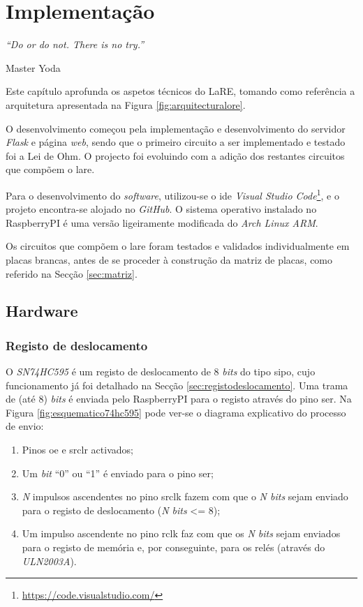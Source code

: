 \label{Capítulo4}
\chapter{Implementação}
\begin{center}
	\textit{``Do or do not. There is no try.''}

	Master Yoda
\end{center}
Este capítulo aprofunda os aspetos técnicos do LaRE, tomando como referência a arquitetura apresentada na Figura \ref{fig:arquitecturalore}.

O desenvolvimento começou pela implementação e desenvolvimento do servidor \textit{Flask} e página \textit{web}, sendo que o primeiro circuito a ser implementado e testado foi a Lei de Ohm. O projecto foi evoluindo com a adição dos restantes circuitos que compõem o \acrshort{lare}.

Para o desenvolvimento do \textit{software}, utilizou-se o \acrshort{ide} \textit{Visual Studio Code}\footnote{\url{https://code.visualstudio.com/}}, e o projeto encontra-se alojado no \textit{GitHub}. O sistema operativo instalado no \gls{RaspberryPI} é uma versão ligeiramente modificada do \textit{Arch Linux ARM}.

Os circuitos que compõem o \acrshort{lare} foram testados e validados individualmente em placas brancas, antes de se proceder à construção da matriz de placas, como referido na Secção \ref{sec:matriz}.

\section{Hardware}
\subsection{Registo de deslocamento}
\label{sec:hwregistodeslocamento}
O \textit{SN74HC595} é um registo de deslocamento de 8 \textit{bits} do tipo \acrshort{sipo}, cujo funcionamento já foi detalhado na Secção \ref{sec:registodeslocamento}. Uma trama de (até 8) \textit{bits} é enviada pelo \gls{RaspberryPI} para o registo através do pino \acrshort{ser}. Na Figura \ref{fig:esquematico74hc595} pode ver-se o diagrama explicativo do processo de envio:

\begin{enumerate}
	\item Pinos \acrshort{oe} e \acrshort{srclr} activados;
	\item Um \textit{bit} ``0'' ou ``1'' é enviado para o pino \acrshort{ser};
	\item \textit{N} impulsos ascendentes no pino \acrshort{srclk} fazem com que o \textit{N bits} sejam enviado para o registo de deslocamento (\textit{N bits} <= 8);
	\item Um impulso ascendente no pino \acrshort{rclk} faz com que os \textit{N bits} sejam enviados para o registo de memória e, por conseguinte, para os relés (através do \textit{ULN2003A}).
\end{enumerate}

